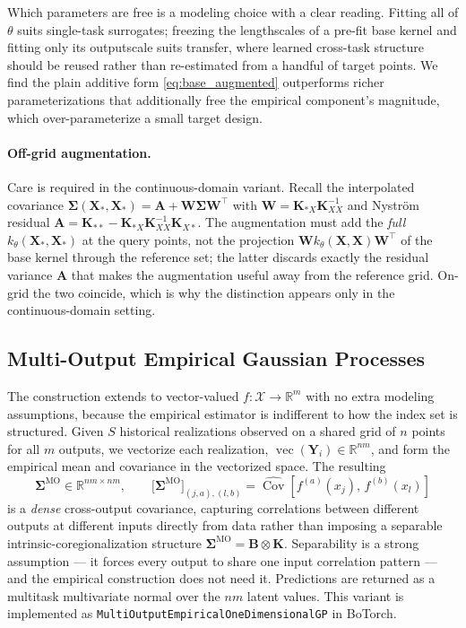 \documentclass{article}
\newcommand{\K}{S}
\newcommand{\domain}{\mathcal{X}}
\newcommand{\bX}{\mathbf{X}}
\begin{document}
Which parameters are free is a modeling choice with a clear reading. Fitting all of $\theta$ suits single-task surrogates; freezing the lengthscales of a pre-fit base kernel and fitting only its outputscale suits transfer, where learned cross-task structure should be reused rather than re-estimated from a handful of target points. We find the plain additive form \eqref{eq:base_augmented} outperforms richer parameterizations that additionally free the empirical component's magnitude, which over-parameterize a small target design.

\paragraph{Off-grid augmentation.}
Care is required in the continuous-domain variant. Recall the interpolated covariance $\boldsymbol{\Sigma}(\bX_*,\bX_*) = \mathbf{A} + \mathbf{W}\boldsymbol{\Sigma}\mathbf{W}^{\!\top}$ with $\mathbf{W} = \mathbf{K}_{*X}\mathbf{K}_{XX}^{-1}$ and Nystr\"om residual $\mathbf{A} = \mathbf{K}_{**} - \mathbf{K}_{*X}\mathbf{K}_{XX}^{-1}\mathbf{K}_{X*}$. The augmentation must add the \emph{full} $k_\theta(\bX_*,\bX_*)$ at the query points, not the projection $\mathbf{W}k_\theta(\bX,\bX)\mathbf{W}^{\!\top}$ of the base kernel through the reference set; the latter discards exactly the residual variance $\mathbf{A}$ that makes the augmentation useful away from the reference grid. On-grid the two coincide, which is why the distinction appears only in the continuous-domain setting.

\subsection{Multi-Output Empirical Gaussian Processes}
\label{apd:multioutput}

The construction extends to vector-valued $f:\domain\to\mathbb{R}^{m}$ with no extra modeling assumptions, because the empirical estimator is indifferent to how the index set is structured. Given $\K$ historical realizations observed on a shared grid of $n$ points for all $m$ outputs, we vectorize each realization, $\operatorname{vec}(\mathbf{Y}_i)\in\mathbb{R}^{nm}$, and form the empirical mean and covariance in the vectorized space. The resulting
\begin{equation}
    \boldsymbol{\Sigma}^{\text{MO}} \in \mathbb{R}^{nm\times nm},
    \qquad
    \big[\boldsymbol{\Sigma}^{\text{MO}}\big]_{(j,a),(l,b)}
    = \widehat{\operatorname{Cov}}\!\left[f^{(a)}(x_j),\, f^{(b)}(x_l)\right]
\end{equation}
is a \emph{dense} cross-output covariance, capturing correlations between different outputs at different inputs directly from data rather than imposing a separable intrinsic-coregionalization structure $\boldsymbol{\Sigma}^{\text{MO}} = \mathbf{B}\otimes\mathbf{K}$. Separability is a strong assumption --- it forces every output to share one input correlation pattern --- and the empirical construction does not need it. Predictions are returned as a multitask multivariate normal over the $nm$ latent values. This variant is implemented as \texttt{MultiOutputEmpiricalOneDimensionalGP} in BoTorch.
\end{document}
